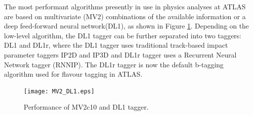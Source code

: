 \documentclass[letterpaper,12pt]{article}
\begin{document}

The most performant algorithms presently in use in physics 
analyses at ATLAS are based on multivariate (MV2) combinations 
of the available information or a deep feed-forward neural 
network(DL1)\cite{tagging}\cite{ATL-PHYS-PUB-2017-013}, as shown in 
Figure \ref{fig:MV2_DL1}. Depending on the low-level algorithm, 
the DL1 tagger can be further separated into two taggers: DL1 and DL1r,
 where the DL1 tagger uses traditional track-based impact parameter 
 taggers IP2D and IP3D and DL1r tagger uses a Recurrent Neural Network tagger 
 (RNNIP)\cite{ATL-PHYS-PUB-2017-013}. The DL1r tagger is now the 
 default b-tagging algorithm used for flavour tagging in ATLAS.
\begin{figure}
\texttt{[image: MV2\_DL1.eps]}
\caption{Performance of MV2c10 and DL1 tagger\cite{FTAG-2018-01}.}\label{fig:MV2_DL1}
\end{figure}
\end{document}
